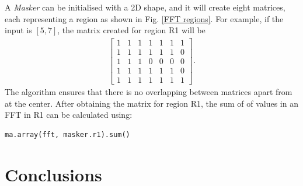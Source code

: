 \documentclass[12pt, conference]{IEEEtran}
\begin{document}
A \textit{Masker} can be initialised with a 2D shape, and it will create eight matrices, each representing a region as shown in Fig. \ref{FFT regions}. For example, if the input is $[5, 7]$, the matrix created for region R1 will be
\begin{align*}
\begin{bmatrix}
1 & 1 & 1 & 1 & 1 & 1 & 1\\
1 & 1 & 1 & 1 & 1 & 1 & 0\\
1 & 1 & 1 & 0 & 0 & 0 & 0\\
1 & 1 & 1 & 1 & 1 & 1 & 0\\
1 & 1 & 1 & 1 & 1 & 1 & 1
\end{bmatrix}.
\end{align*}
The algorithm ensures that there is no overlapping between matrices apart from at the center. After obtaining the matrix for region R1, the sum of of values in an FFT in R1 can be calculated using:
\begin{lstlisting}
ma.array(fft, masker.r1).sum()
\end{lstlisting}

\section{Conclusions}
\end{document}
